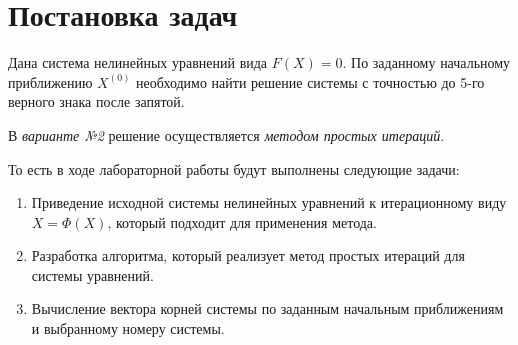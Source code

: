 \section{Постановка задач}

Дана система нелинейных уравнений вида $F(X) = 0$. По заданному начальному приближению $X^{(0)}$ необходимо найти решение системы с точностью до 5-го верного знака после запятой.

В \textit{варианте №2} решение осуществляется \textit{методом простых итераций}.

То есть в ходе лабораторной работы будут выполнены следующие задачи:

\begin{enumerate}
    \item Приведение исходной системы нелинейных уравнений к итерационному виду $X = \Phi(X)$, который подходит для применения метода.
    \item Разработка алгоритма, который реализует метод простых итераций для системы уравнений.
    \item Вычисление вектора корней системы по заданным начальным приближениям и выбранному номеру системы.
\end{enumerate}